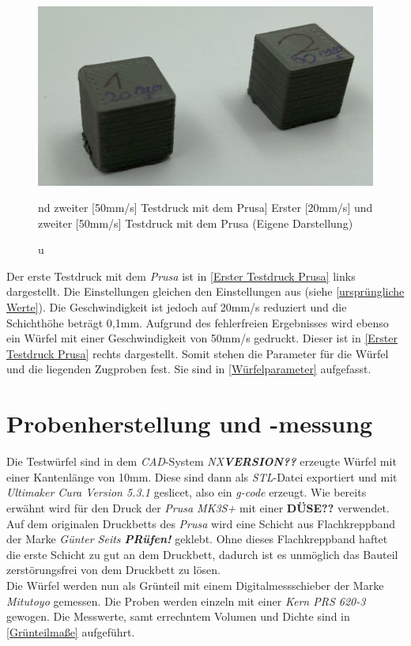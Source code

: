 \begin{figure}[h]
	\centering
	\includegraphics[width=\linewidth]{bilder/Erster Testdruck mit Prusa.png}
        \caption[Erster [20mm/s] und zweiter [50mm/s] Testdruck mit dem Prusa] {Erster [20mm/s] und zweiter [50mm/s] Testdruck mit dem Prusa (Eigene Darstellung)}
	\label{Erster Testdruck Prusa}
\end{figure}

Der erste Testdruck mit dem \textit{Prusa} ist in \autoref{Erster Testdruck Prusa} links dargestellt. Die Einstellungen gleichen den Einstellungen aus \autocite{M.Mickan}
(siehe \autoref{ursprüngliche Werte}). Die Geschwindigkeit ist jedoch auf 20mm/s reduziert und die Schichthöhe beträgt 0,1mm. Aufgrund des fehlerfreien Ergebnisses wird ebenso ein Würfel mit einer Geschwindigkeit von 50mm/s gedruckt. Dieser ist in \autoref{Erster Testdruck Prusa} rechts dargestellt. Somit stehen die Parameter für die Würfel und die liegenden Zugproben fest. Sie sind in \autoref{Würfelparameter} aufgefasst. 

\section{Probenherstellung und -messung}
Die Testwürfel sind in dem \textit{CAD}-System \textit{NX\textbf{VERSION??}} erzeugte Würfel mit einer Kantenlänge von 10mm. Diese sind dann als \textit{STL}-Datei exportiert und mit \textit{Ultimaker Cura Version 5.3.1} geslicet, also ein \textit{g-code} erzeugt. Wie bereits erwähnt wird für den Druck der \textit{Prusa MK3S+} mit einer \textbf{DÜSE??} verwendet. Auf dem originalen Druckbetts des \textit{Prusa} wird eine Schicht aus Flachkreppband der Marke \textit{Günter Seits \textbf{PRüfen!}} geklebt. Ohne dieses Flachkreppband haftet die erste Schicht zu gut an dem Druckbett, dadurch ist es unmöglich das Bauteil zerstörungsfrei von dem Druckbett zu lösen.\\
Die Würfel werden nun als Grünteil mit einem Digitalmessschieber der Marke \textit{Mitutoyo} gemessen. Die Proben werden einzeln mit einer \textit{Kern PRS 620-3} gewogen. Die Messwerte, samt errechntem Volumen und Dichte sind in \autoref{Grünteilmaße} aufgeführt.